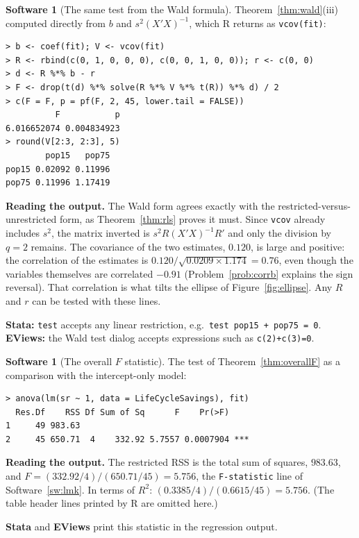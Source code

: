 \documentclass[11pt,a4paper]{article}
\numberwithin{equation}{section}
\theoremstyle{definition}
\newtheorem{software}[thm]{Software}
\begin{document}
\begin{software}[The same test from the Wald formula]
\label{sw:waldmat}
Theorem~\ref{thm:wald}(iii) computed directly from $b$ and $s^2(X'X)^{-1}$, which R returns as \texttt{vcov(fit)}:
{\small\begin{verbatim}
> b <- coef(fit); V <- vcov(fit)
> R <- rbind(c(0, 1, 0, 0, 0), c(0, 0, 1, 0, 0)); r <- c(0, 0)
> d <- R %*% b - r
> F <- drop(t(d) %*% solve(R %*% V %*% t(R)) %*% d) / 2
> c(F = F, p = pf(F, 2, 45, lower.tail = FALSE))
          F           p
6.016652074 0.004834923
> round(V[2:3, 2:3], 5)
        pop15   pop75
pop15 0.02092 0.11996
pop75 0.11996 1.17419
\end{verbatim}}
\textbf{Reading the output.} The Wald form agrees exactly with the restricted-versus-unrestricted form, as Theorem~\ref{thm:rls} proves it must. Since
\texttt{vcov} already includes $s^2$, the matrix inverted is $s^2R(X'X)^{-1}R'$ and only the division by $q = 2$ remains. The covariance of the two estimates,
$0.120$, is large and positive: the correlation of the estimates is $0.120/\sqrt{0.0209 \times 1.174} = 0.76$, even though the variables themselves are
correlated $-0.91$ (Problem~\ref{prob:corrb} explains the sign reversal). That correlation is what tilts the ellipse of Figure~\ref{fig:ellipse}. Any $R$
and $r$ can be tested with these lines.

\textbf{Stata:} \texttt{test} accepts any linear restriction, e.g.\ \texttt{test pop15 + pop75 = 0}. \textbf{EViews:} the Wald test dialog accepts
expressions such as \texttt{c(2)+c(3)=0}.
\end{software}

\begin{software}[The overall $F$ statistic]
\label{sw:overall}
The test of Theorem~\ref{thm:overallF} as a comparison with the intercept-only model:
{\small\begin{verbatim}
> anova(lm(sr ~ 1, data = LifeCycleSavings), fit)
  Res.Df    RSS Df Sum of Sq      F    Pr(>F)
1     49 983.63
2     45 650.71  4    332.92 5.7557 0.0007904 ***
\end{verbatim}}
\textbf{Reading the output.} The restricted RSS is the total sum of squares, $983.63$, and $F = (332.92/4)/(650.71/45) = 5.756$, the \texttt{F-statistic} line
of Software~\ref{sw:lmk}. In terms of $R^2$: $(0.3385/4)/(0.6615/45) = 5.756$. (The table header lines printed by R are omitted here.)

\textbf{Stata} and \textbf{EViews} print this statistic in the regression output.
\end{software}
\end{document}
